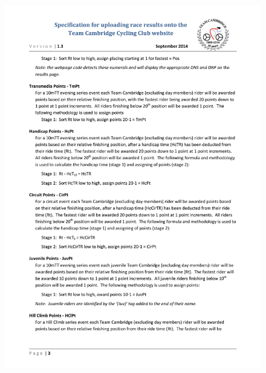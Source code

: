 \begin{figure}[H]
    \includegraphics[width=\textwidth]{./TeamCambridgeSpec/page3.pdf}
\end{figure}

